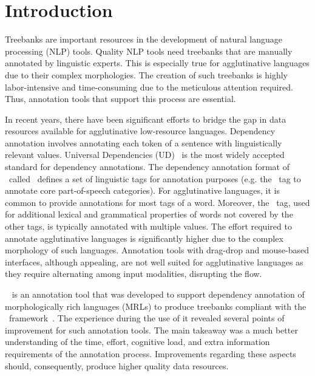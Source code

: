 \section{Introduction}
\label{sec:introduction}

Treebanks are important resources in the development of natural language processing (NLP) tools.
Quality NLP tools need treebanks that are manually annotated by linguistic experts.
This is especially true for agglutinative languages due to their complex morphologies.
The creation of such treebanks is highly labor-intensive and time-consuming due to the meticulous attention required.
Thus, annotation tools that support this process are essential.

In recent years, there have been significant efforts to bridge the gap in data resources available for agglutinative low-resource languages.
Dependency annotation involves annotating each token of a sentence with linguistically relevant values.
Universal Dependencies (UD)~\cite{UD} is the most widely accepted standard for dependency annotations.
The dependency annotation format of \ud\ called \conll\ defines a set of linguistic tags for annotation purposes (e.g. the \upos\ tag to annotate core part-of-speech categories).
For agglutinative languages, it is common to provide annotations for most tags of a word.
Moreover, the \feats\ tag, used for additional lexical and grammatical properties of words not covered by the other tags, is typically annotated with multiple values.
The effort required to annotate agglutinative languages is significantly higher due to the complex morphology of such languages.
Annotation tools with drag-drop and mouse-based interfaces, although appealing, are not well suited for agglutinative languages as they require alternating among input modalities, disrupting the flow.

\boatvone~\cite{turk2021resources} is an annotation tool that was developed to support dependency annotation of morphologically rich languages (MRLs) to produce treebanks compliant with the \ud\ framework~\cite{UD}.
The experience during the use of it revealed several points of improvement for such annotation tools.
The main takeaway was a much better understanding of the time, effort, cognitive load, and extra information requirements of the annotation process.
Improvements regarding these aspects should, consequently, produce higher quality data resources.

